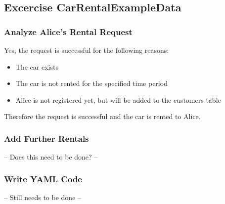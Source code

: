 \subsection{Excercise CarRentalExampleData}
\label{sec:exercise_car_rental_example_data}
\subsubsection*{Analyze Alice's Rental Request}
Yes, the request is successful for the following reasons:
\begin{itemize}
    \item The car exists
    \item The car is not rented for the specified time period
    \item Alice is not registered yet, but will be added to the customers table
\end{itemize}
Therefore the request is successful and the car is rented to Alice.

\subsubsection{Add Further Rentals}
-- Does this need to be done? --

\subsubsection*{Write YAML Code}
-- Still needs to be done --